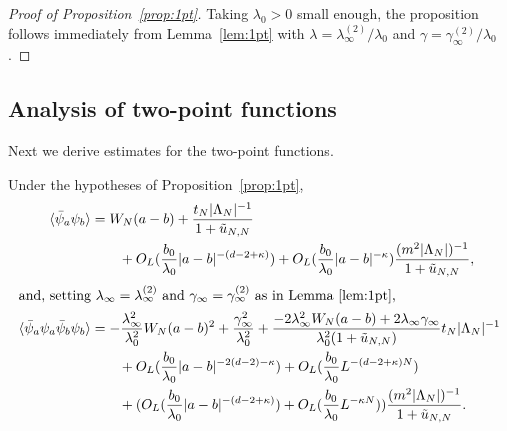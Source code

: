 \documentclass[11pt]{amsart}
\numberwithin{equation}{section}
\numberwithin{theorem}{section}
\newcommand{\1}{{\bf 1}}
\newcommand{\OL}{O_L}
\newcommand{\clambda}{\lambda}
\newcommand{\cgamma}{\gamma}
\begin{document}
\begin{proof}[Proof of Proposition~\ref{prop:1pt}]
  Taking $\lambda_0>0$ small enough,  the proposition follows immediately from Lemma~\ref{lem:1pt} with $\clambda = \lambda_\infty^{(2)}/\lambda_0$
  and $\cgamma = \gamma_\infty^{(2)}/\lambda_0$.
\end{proof}

\subsection{Analysis of two-point functions}

Next we derive estimates for the two-point functions.

\begin{lemma} \label{lem:2pt}
  Under the hypotheses of Proposition~\ref{prop:1pt},
  \begin{align}
    \label{e:2pt-a}
    \avg{\bar\psi_a\psi_b}
    &=
      W_N(a-b)
      + \frac{
      t_N|\Lambda_N|^{-1}
      }{1+\tilde u_{N,N}}
      \nnb
    &
      \qquad
      + \OL(\frac{b_0}{\lambda_0}|a-b|^{-(d-2+\kappa)})
      + 
      \OL(\frac{b_0}{\lambda_0} |a-b|^{-\kappa})
      \frac{(m^2|\Lambda_N|)^{-1}}{1+\tilde u_{N,N}}, 
    \\
    \intertext{and, setting
    $\lambda_\infty = \lambda^{(2)}_\infty$
    and $\gamma_\infty = \gamma^{(2)}_\infty$ as in Lemma~\ref{lem:1pt},}
    \label{e:2pt-b}
    \avg{\bar\psi_a\psi_a\bar\psi_b\psi_b}
      &= -\frac{\lambda_\infty^2}{\lambda_0^2} W_N(a-b)^2 +
        \frac{\gamma_\infty^2}{\lambda_0^2}
        +\frac{-2\lambda_\infty^2 W_N(a-b)
        + 2\lambda_{\infty}\gamma_{\infty} 
        }{\lambda_0^2(1+\tilde u_{N,N})}t_N|\Lambda_N|^{-1}
      \nnb
      &\qquad
        + \OL(\frac{b_0}{\lambda_0} |a-b|^{-2(d-2)-\kappa})
        + \OL(\frac{b_0}{\lambda_0}L^{-(d-2+\kappa)N})
        \nnb
        &\qquad
        + 
        (\OL(\frac{b_0}{\lambda_0}|a-b|^{-(d-2+\kappa)})+\OL(\frac{b_0}{\lambda_0}L^{-\kappa N}))\frac{(m^{2}|\Lambda_N|)^{-1}}{1+\tilde u_{N,N}}
        .
  \end{align}
\end{lemma}
\end{document}
